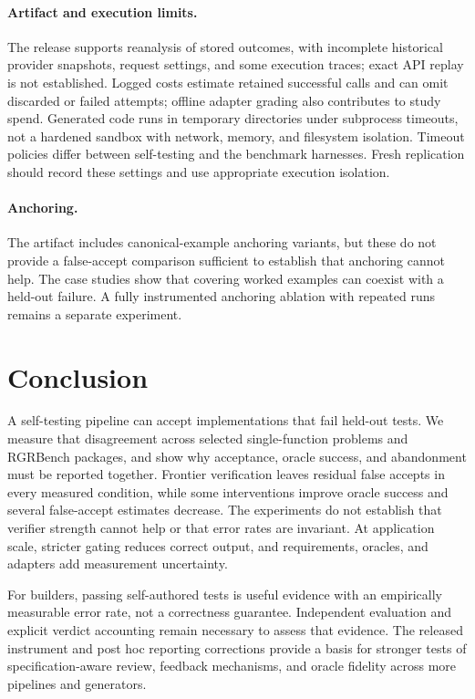 \paragraph{Artifact and execution limits.} The release supports reanalysis of stored outcomes,
with incomplete historical provider snapshots, request settings, and some execution traces;
exact API replay is not established. Logged costs estimate retained successful calls and can
omit discarded or failed attempts; offline adapter grading also contributes to study spend.
Generated code runs in temporary directories under subprocess timeouts, not a hardened sandbox
with network, memory, and filesystem isolation. Timeout policies differ between self-testing
and the benchmark harnesses. Fresh replication should record these settings and use appropriate
execution isolation.

\paragraph{Anchoring.} The artifact includes canonical-example anchoring variants, but these do
not provide a false-accept comparison sufficient to establish that anchoring cannot help. The
case studies show that covering worked examples can coexist with a held-out failure. A fully
instrumented anchoring ablation with repeated runs remains a separate experiment.

\section{Conclusion}
\label{sec:conclusion}

A self-testing pipeline can accept implementations that fail held-out tests. We measure
that disagreement across selected single-function problems and RGRBench packages, and show
why acceptance, oracle success, and abandonment must be reported together. Frontier
verification leaves residual false accepts in every measured condition, while some
interventions improve oracle success and several false-accept estimates decrease. The
experiments do not establish that verifier strength cannot help or that error rates are
invariant. At application scale, stricter gating reduces correct output, and requirements,
oracles, and adapters add measurement uncertainty.

For builders, passing self-authored tests is useful evidence with an empirically measurable
error rate, not a correctness guarantee. Independent evaluation and explicit verdict
accounting remain necessary to assess that evidence. The released instrument and post hoc
reporting corrections provide a basis for stronger tests of specification-aware review,
feedback mechanisms, and oracle fidelity across more pipelines and generators.
